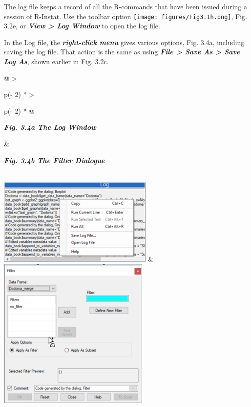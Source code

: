 \documentclass[
  letterpaper,
  DIV=11,
  numbers=noendperiod]{scrreprt}
\begin{document}
The log file keeps a record of all the R-commands that have been issued
during a session of R-Instat. Use the toolbar option
\texttt{[image: figures/Fig3.1h.png]},
Fig. 3.2e, or \textbf{\emph{View \textgreater{} Log Window}} to open the
log file.

In the Log file, the \textbf{\emph{right-click menu}} gives various
options, Fig. 3.4a, including saving the log file. That action is the
same as using \textbf{\emph{File \textgreater{} Save As \textgreater{}
Save Log As}}, shown earlier in Fig. 3.2c.

\begin{longtable}[]{@{}
  >{\raggedright\arraybackslash}p{(\columnwidth - 2\tabcolsep) * }
  >{\raggedright\arraybackslash}p{(\columnwidth - 2\tabcolsep) * }@{}}
\toprule\noalign{}
\begin{minipage}[b]{\linewidth}\raggedright
\textbf{\emph{Fig. 3.4a The Log Window}}
\end{minipage} & \begin{minipage}[b]{\linewidth}\raggedright
\textbf{\emph{Fig. 3.4b The Filter Dialogue}}
\end{minipage} \\
\midrule\noalign{}
\endhead
\bottomrule\noalign{}
\endlastfoot
\includegraphics[width=3.02577in,height=1.6994in]{figures/Fig3.4a.png} &
\includegraphics[width=2.95569in,height=2.96513in]{figures/Fig3.4b.png} \\
\end{longtable}
\end{document}
